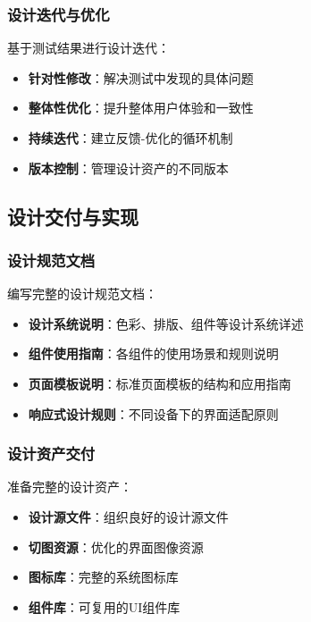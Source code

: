 \subsubsection{设计迭代与优化}\label{ux8bbeux8ba1ux8fedux4ee3ux4e0eux4f18ux5316}

基于测试结果进行设计迭代：

\begin{itemize}
\tightlist
\item
  \textbf{针对性修改}：解决测试中发现的具体问题
\item
  \textbf{整体性优化}：提升整体用户体验和一致性
\item
  \textbf{持续迭代}：建立反馈-优化的循环机制
\item
  \textbf{版本控制}：管理设计资产的不同版本
\end{itemize}

\subsection{设计交付与实现}\label{ux8bbeux8ba1ux4ea4ux4ed8ux4e0eux5b9eux73b0}

\subsubsection{设计规范文档}\label{ux8bbeux8ba1ux89c4ux8303ux6587ux6863}

编写完整的设计规范文档：

\begin{itemize}
\tightlist
\item
  \textbf{设计系统说明}：色彩、排版、组件等设计系统详述
\item
  \textbf{组件使用指南}：各组件的使用场景和规则说明
\item
  \textbf{页面模板说明}：标准页面模板的结构和应用指南
\item
  \textbf{响应式设计规则}：不同设备下的界面适配原则
\end{itemize}

\subsubsection{设计资产交付}\label{ux8bbeux8ba1ux8d44ux4ea7ux4ea4ux4ed8}

准备完整的设计资产：

\begin{itemize}
\tightlist
\item
  \textbf{设计源文件}：组织良好的设计源文件
\item
  \textbf{切图资源}：优化的界面图像资源
\item
  \textbf{图标库}：完整的系统图标库
\item
  \textbf{组件库}：可复用的UI组件库
\end{itemize}

